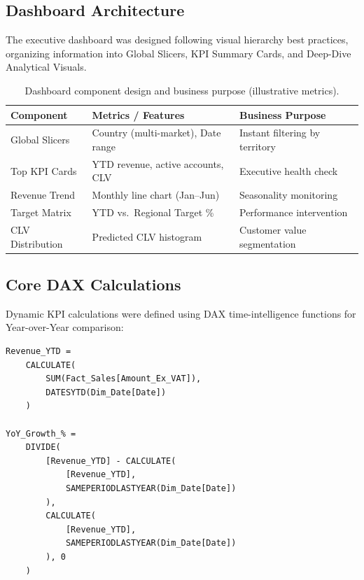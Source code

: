 \documentclass[11pt,a4paper]{article}
\begin{document}
\subsection{Dashboard Architecture}

The executive dashboard was designed following visual hierarchy best practices, organizing information into Global Slicers, KPI Summary Cards, and Deep-Dive Analytical Visuals.

\begin{table}[H]
\caption{Dashboard component design and business purpose (illustrative metrics).}
\setlength{\tabcolsep}{8pt}
\renewcommand{\arraystretch}{1.4}
\begin{tabular}{l l l}
\toprule
\textbf{Component} & \textbf{Metrics / Features} & \textbf{Business Purpose} \\
\midrule
Global Slicers & Country (multi-market), Date range & Instant filtering by territory \\
Top KPI Cards & YTD revenue, active accounts, CLV & Executive health check \\
Revenue Trend & Monthly line chart (Jan--Jun) & Seasonality monitoring \\
Target Matrix & YTD vs.\ Regional Target \% & Performance intervention \\
CLV Distribution & Predicted CLV histogram & Customer value segmentation \\
\bottomrule
\end{tabular}
\end{table}

\subsection{Core DAX Calculations}

Dynamic KPI calculations were defined using DAX time-intelligence functions for Year-over-Year comparison:

\begin{lstlisting}[language={}]
Revenue_YTD =
    CALCULATE(
        SUM(Fact_Sales[Amount_Ex_VAT]),
        DATESYTD(Dim_Date[Date])
    )

YoY_Growth_% =
    DIVIDE(
        [Revenue_YTD] - CALCULATE(
            [Revenue_YTD],
            SAMEPERIODLASTYEAR(Dim_Date[Date])
        ),
        CALCULATE(
            [Revenue_YTD],
            SAMEPERIODLASTYEAR(Dim_Date[Date])
        ), 0
    )
\end{lstlisting}

\end{document}
